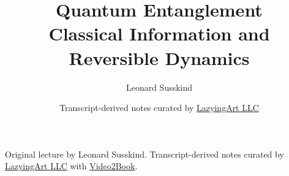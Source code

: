 \documentclass[11pt,oneside]{book}
\begin{document}
\frontmatter
\title{Quantum Entanglement\\Classical Information and Reversible Dynamics}
\author{Leonard Susskind}
\date{Transcript-derived notes curated by \href{https://lazying.art}{LazyingArt LLC}}
\maketitle
\begin{center}
\small Original lecture by Leonard Susskind. Transcript-derived notes curated by \href{https://lazying.art}{LazyingArt LLC} with \href{https://github.com/lachlanchen/Video2Book}{Video2Book}.
\end{center}
\clearpage
\mainmatter

\end{document}
